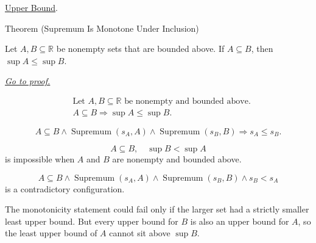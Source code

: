 \begin{remark*}[Dependencies]
\hyperref[def:upper-bound]{Upper Bound}.
\end{remark*}


\begin{theorembox}{Theorem (Supremum Is Monotone Under Inclusion)}
\begin{theorem}
\label{thm:supremum-is-monotone-under-inclusion}
Let $A,B\subseteq\mathbb{R}$ be nonempty sets that are bounded above. If $A\subseteq B$, then $\sup A\le \sup B$.

\smallskip
\noindent
\hyperref[prf:supremum-is-monotone-under-inclusion]{\textit{Go to proof.}}
\end{theorem}
\end{theorembox}

\begin{remark*}
\[
\begin{aligned}
&\text{Let }A,B\subseteq\mathbb{R}\text{ be nonempty and bounded above.}\\
&A\subseteq B
\Longrightarrow
\sup A\le \sup B.
\end{aligned}
\]
\end{remark*}

\begin{remark*}
\[
A\subseteq B\land \operatorname{Supremum}(s_A,A)\land \operatorname{Supremum}(s_B,B)
\Longrightarrow
s_A\le s_B.
\]
\end{remark*}

\begin{remark*}
\[
A\subseteq B,\quad \sup B<\sup A
\]
is impossible when $A$ and $B$ are nonempty and bounded above.
\end{remark*}

\begin{remark*}
\[
A\subseteq B\land \operatorname{Supremum}(s_A,A)\land \operatorname{Supremum}(s_B,B)\land s_B<s_A
\]
is a contradictory configuration.
\end{remark*}

\begin{remark*}
The monotonicity statement could fail only if the larger set had a strictly smaller least upper bound. But every upper bound for $B$ is also an upper bound for $A$, so the least upper bound of $A$ cannot sit above $\sup B$.
\end{remark*}

